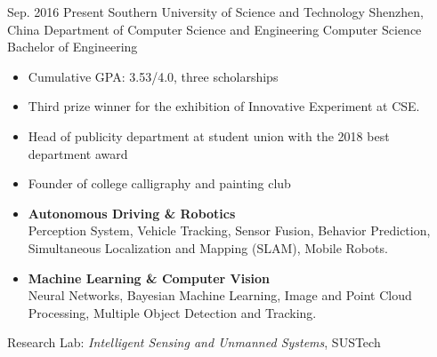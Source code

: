 \documentclass{resume}
\begin{document}
\makeheader

\begin{educations}
  \education%
    {Sep. 2016}%
    {Present}%
    {Southern University of Science and Technology}%
    {Shenzhen, China}%
    {Department of Computer Science and Engineering}%
    {Computer Science}%
    {Bachelor of Engineering}%
	{\begin{itemize}%
		\item Cumulative GPA: 3.53/4.0, three scholarships
		\item Third prize winner for the exhibition of Innovative Experiment at CSE.
		\item Head of publicity department at student union with the 2018 best department award
		\item Founder of college calligraphy and painting club
	\end{itemize}}%
\end{educations}
	
\begin{itemize}
  \item \textbf{Autonomous Driving \& Robotics}\\
  	Perception System, Vehicle Tracking, Sensor Fusion, Behavior Prediction, Simultaneous Localization and Mapping (SLAM), Mobile Robots.
  \item \textbf{Machine Learning \& Computer Vision}\\
  	Neural Networks, Bayesian Machine Learning, Image and Point Cloud Processing, Multiple Object Detection and Tracking.   	
\end{itemize}


Research Lab: \textit{Intelligent Sensing and Unmanned Systems}, SUSTech
\end{document}
